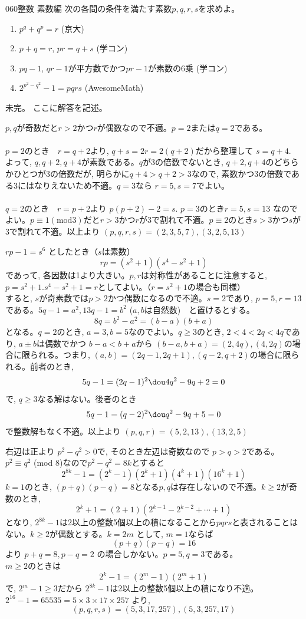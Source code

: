 \begin{prob}{060}{}{整数 素数編}
 次の各問の条件を満たす素数$p, q, r, s$を求めよ。
 \begin{enumerate}
  \item $p^q+q^p=r$ (京大)
  \item $p+q=r$, $pr=q+s$ (学コン)
  \item $pq-1$, $qr-1$が平方数でかつ$pr-1$が素数の6乗 (学コン)
  \item $2^{p^2-q^2}-1=pqrs$ (AwesomeMath)
 \end{enumerate}
\end{prob}
未完。
ここに解答を記述。

$p,q$が奇数だと$r>2$かつ$r$が偶数なので不適。$p=2$または$q=2$である。\\
\\
$p=2$のとき　$r=q+2$より, $q+s=2r=2(q+2)$だから整理して $s=q+4$.　よって, $q,q+2,q+4$が素数である。$q$が3の倍数でないとき, $q+2, q+4$のどちらかひとつが3の倍数だが, 明らかに$q+4>q+2>3$なので, 素数かつ3の倍数である3にはなりえないため不適。$q=3$なら $r=5, s=7$でよい。\\
\\
$q=2$のとき　$r=p+2$より $p(p+2)-2=s$. $p=3$のとき$r=5, s=13$ なのでよい。$p\equiv 1 　(\mbox{mod} 3)$だと$r>3$かつ$r$が3で割れて不適。$p\equiv 2$のとき$s>3$かつ$s$が3で割れて不適。以上より $(p,q,r,s)=(2,3,5,7), (3,2,5,13)$

$rp-1=s^6$ としたとき（$s$は素数）
\[rp=(s^2+1)(s^4-s^2+1)\]
であって, 各因数は1より大きい。$p,r$は対称性があることに注意すると, $p=s^2+1. s^4-s^2+1=r$としてよい。（$r=s^2+1$の場合も同様）\\
すると, $s$が奇素数では$p>2$かつ偶数になるので不適。$s=2$であり, $p=5, r=13$である。$5q-1=a^2, 13q-1=b^2$ ($a,b$は自然数)　と置けるとする。
\[8q=b^2-a^2=(b-a)(b+a)\]
となる。$q=2$のとき, $a=3, b=5$なのでよい。$q\geq 3$のとき, $2<4<2q<4q$であり, $a\pm b$は偶数でかつ $b-a<b+a$から $(b-a,b+a)=(2, 4q), (4,2q)$の場合に限られる。つまり, $(a,b)=(2q-1, 2q+1), (q-2, q+2)$の場合に限られる。前者のとき,
\[5q-1=(2q-1)^2 \dou 4q^2-9q+2=0\]
で, $q\geq 3$なる解はない。後者のとき
\[5q-1=(q-2)^2 \dou q^2-9q+5=0\]
で整数解もなく不適。以上より $(p,q,r)=(5,2,13), (13,2,5)$

右辺は正より $p^2-q^2>0$で, そのとき左辺は奇数なので $p>q>2$である。$p^2\equiv q^2$ (mod $8$)なので$p^2-q^2=8k$とすると
\[2^{8k}-1=(2^k-1)(2^k+1)(4^k+1)(16^k+1)\]
$k=1$のとき, $(p+q)(p-q)=8$となる$p,q$は存在しないので不適。$k\geq 2$が奇数のとき, 
\[2^k+1=(2+1)(2^{k-1}-2^{k-2}+\cdots +1)\]
となり, $2^{8k}-1$は2以上の整数5個以上の積になることから$pqrs$と表されることはない。$k\geq 2$が偶数とする。$k=2m$ として, $m=1$ならば 
\[(p+q)(p-q)=16\]
より $p+q=8, p-q=2$ の場合しかない。$p=5, q=3$である。\\
$m\geq 2$のときは
\[2^{k}-1=(2^m-1)(2^m+1)\]
で, $2^{m}-1\geq 3$だから $2^{8k}-1$は2以上の整数5個以上の積になり不適。\\
$2^{16}-1=65535=5\times 3\times 17\times 257$ より,
\[(p,q,r,s)=(5,3,17,257), (5,3,257,17)\]

